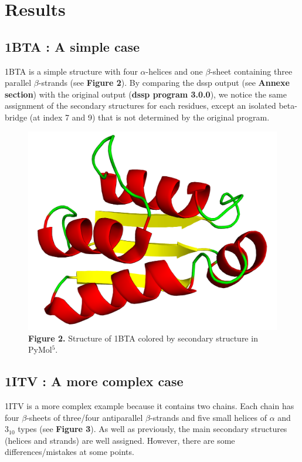 \documentclass[12pt]{article}
\begin{document}
\section{Results}

\subsection{1BTA : A simple case}
1BTA is a simple structure with four $\alpha$-helices and one $\beta$-sheet containing three parallel $\beta$-strands (see \textbf{Figure 2}). By comparing the dssp output (see \textbf{Annexe section}) with the original output (\textbf{dssp program 3.0.0}), we notice the same assignment of the secondary structures for each residues, except an isolated beta-bridge (at index 7 and 9) that is not determined by the original program.

\begin{figure}[h!]
	\centering
	\includegraphics[totalheight=5cm]{img/1bta.png}
	\label{fig:verticalcell}
	\footnotesize\textbf{\\Figure 2.} Structure of 1BTA colored by secondary structure in PyMol$^5$.
\end{figure}

\subsection{1ITV : A more complex case}
 1ITV is a more complex example because it contains two chains. Each chain has four $\beta$-sheets of three/four antiparallel $\beta$-strands and five small helices of $\alpha$ and $\textrm{3}_\textrm{10}$ types (see \textbf{Figure 3}). As well as previously, the main secondary structures (helices and strands) are well assigned. However, there are some differences/mistakes at some points.
 
\end{document}
